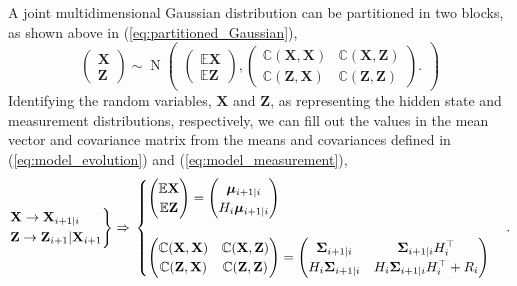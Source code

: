 \documentclass[12pt, twoside, draft]{article}
\begin{document}
A joint multidimensional Gaussian distribution can be partitioned in two blocks, as shown above in (\ref{eq:partitioned_Gaussian}),
\begin{equation}
\begin{pmatrix} \mathbf{X} \\ \mathbf{Z} \end{pmatrix} \sim
\operatorname{N} 
\begin{pmatrix}  
\begin{pmatrix}\mathbb{E} \mathbf{X} \\ \mathbb{E} \mathbf{Z} \end{pmatrix},
\begin{pmatrix} \mathbb{C}(\mathbf{X}, \mathbf{X}) & \mathbb{C}(\mathbf{X}, \mathbf{Z}) \\ \mathbb{C}(\mathbf{Z}, \mathbf{X}) & \mathbb{C}(\mathbf{Z}, \mathbf{Z}) \end{pmatrix}.
\end{pmatrix}
\end{equation}
Identifying the random variables, $\mathbf{X}$ and $\mathbf{Z}$, as representing the hidden state and measurement distributions, respectively, we can fill out the values in the mean vector and covariance matrix from the means and covariances defined in (\ref{eq:model_evolution}) and (\ref{eq:model_measurement}),
\begin{equation}
\begin{rcases}
\mathbf{X} \rightarrow \mathbf{X}_{i+1|i} \\
\mathbf{Z} \rightarrow \mathbf{Z}_{i+1}| \mathbf{X}_{i+1}
\end{rcases} \Rightarrow \\
\begin{cases}
\begin{pmatrix} \mathbb{E}\mathbf{X} \\ \mathbb{E}\mathbf{Z}  \end{pmatrix} = \begin{pmatrix} \boldsymbol{\mu}_{i+1|i} \\ H_i \boldsymbol{\mu}_{i+1|i} \end{pmatrix} \\ \\
\begin{pmatrix} \mathbb{C}(\mathbf{X}, \mathbf{X}) & \mathbb{C}(\mathbf{X}, \mathbf{Z}) \\ \mathbb{C}(\mathbf{Z}, \mathbf{X}) & \mathbb{C}(\mathbf{Z}, \mathbf{Z}) \end{pmatrix} =
\begin{pmatrix} 
\boldsymbol{\Sigma}_{i+1|i} &  \boldsymbol{\Sigma}_{i+1|i} H_i^\top \\
H_i \boldsymbol{\Sigma}_{i+1|i} & H_i \boldsymbol{\Sigma}_{i+1|i} H_i^\top + R_i
\end{pmatrix}
\end{cases}.
\end{equation}
\end{document}
